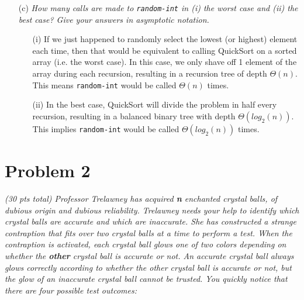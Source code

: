 \documentclass[12pt]{article} \setlength{\oddsidemargin}{0in}
\begin{document}
{\begin{enumerate}
\begin{verbatim}
[9, 7, 5, 11, 12, 2, 14, 3, 10, 6] a[j]= 9 x= 6 
[9, 7, 5, 11, 12, 2, 14, 3, 10, 6] a[j]= 7 x= 6 
[9, 7, 5, 11, 12, 2, 14, 3, 10, 6] a[j]= 5 x= 6 
[5, 7, 9, 11, 12, 2, 14, 3, 10, 6] a[j]= 11 x= 6 
[5, 7, 9, 11, 12, 2, 14, 3, 10, 6] a[j]= 12 x= 6 
[5, 7, 9, 11, 12, 2, 14, 3, 10, 6] a[j]= 2 x= 6 
[5, 2, 9, 11, 12, 7, 14, 3, 10, 6] a[j]= 14 x= 6 
[5, 2, 9, 11, 12, 7, 14, 3, 10, 6] a[j]= 3 x= 6 *
[5, 2, 3, 11, 12, 7, 14, 9, 10, 6] a[j]= 10 x= 6 
[5, 2, 3] a[j]= 5 x= 3 *
[5, 2, 3] a[j]= 2 x= 3 *
[12, 7, 14, 9, 10, 11] a[j]= 12 x= 11 
[12, 7, 14, 9, 10, 11] a[j]= 7 x= 11 
[7, 12, 14, 9, 10, 11] a[j]= 14 x= 11 
[7, 12, 14, 9, 10, 11] a[j]= 9 x= 11 
[7, 9, 14, 12, 10, 11] a[j]= 10 x= 11 
[7, 9, 10] a[j]= 7 x= 10 
[7, 9, 10] a[j]= 9 x= 10 
[7, 9] a[j]= 7 x= 9 
[14, 12] a[j]= 14 x= 12 
[2, 3, 5, 6, 7, 9, 10, 11, 12, 14]
    \end{verbatim}

  \item[(c)]{\textit{How many calls are made to \texttt{random-int} in (i) the
      worst case and (ii) the best case? Give your answers in
      asymptotic notation.}}

    \begin{itemize}
      \item[(i)] If we just happened to randomly select the lowest (or highest) element each time, then that would be equivalent to calling QuickSort on a sorted array (i.e. the worst case). In this case, we only shave off 1 element of the array during each recursion, resulting in a recursion tree of depth $\Theta(n)$. This means \texttt{random-int} would be called $\Theta(n)$ times. 

      \item[(ii)] In the best case, QuickSort will divide the problem in half every recursion, resulting in a balanced binary tree with depth $\Theta(log_2(n))$. This implies \texttt{random-int} would be called $\Theta(log_2(n))$ times. 
    \end{itemize}

  \end{enumerate}

  \newpage

  \section*{Problem 2}

  \textit{(30 pts total) Professor Trelawney has acquired \textbf{n}
    enchanted crystal balls, of dubious origin and dubious
    reliability. Trelawney needs your help to identify which crystal
    balls are accurate and which are inaccurate. She has constructed a
    strange contraption that fits over two crystal balls at a time
    to perform a test. When the contraption is activated, each crystal
    ball glows one of two colors depending on whether the
    \textbf{other} crystal ball is accurate or not. An accurate
    crystal ball always glows correctly according to whether the other
    crystal ball is accurate or not, but the glow of an inaccurate
    crystal ball cannot be trusted. You quickly notice that there are
    four possible test outcomes:}

}
\end{document}

